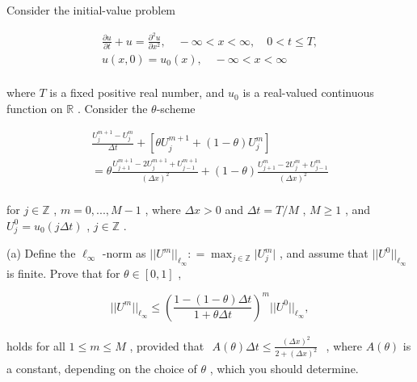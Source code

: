 \begin{exercise}
\label{applied:2025:5}
Consider the initial-value problem

\[
\begin{array}{l} \frac {\partial u}{\partial t} + u = \frac {\partial^ {2} u}{\partial x ^ {2}}, \quad - \infty <   x <   \infty , \quad 0 <   t \leq T, \\ u (x, 0) = u _ {0} (x), \quad - \infty <   x <   \infty \\ \end{array}
\]

where $T$ is a fixed positive real number, and $u _ { 0 }$ is a real-valued continuous function on $\mathbb { R }$ . Consider the $\theta$-scheme

\[
\begin{array}{l} \frac {U _ {j} ^ {m + 1} - U _ {j} ^ {m}}{\Delta t} + [ \theta U _ {j} ^ {m + 1} + (1 - \theta) U _ {j} ^ {m} ] \\ = \theta \frac {U _ {j + 1} ^ {m + 1} - 2 U _ {j} ^ {m + 1} + U _ {j - 1} ^ {m + 1}}{(\Delta x) ^ {2}} + (1 - \theta) \frac {U _ {j + 1} ^ {m} - 2 U _ {j} ^ {m} + U _ {j - 1} ^ {m}}{(\Delta x) ^ {2}} \\ \end{array}
\]

for $j \in \mathbb Z$ , $m = 0 , . . . , M - 1$ , where $\Delta x > 0$ and $\Delta t = T / M$ , $M \geq 1$ , and $U _ { j } ^ { 0 } = u _ { 0 } ( j \Delta t )$ , $j \in \mathbb Z$ .

(a) Define the $\ell _ { \infty }$ -norm as $\vert \vert U ^ { m } \vert \vert _ { \ell _ { \infty } } : = \operatorname* { m a x } _ { j \in \mathbb { Z } } \vert U _ { j } ^ { m } \vert$ , and assume that $| | U ^ { 0 } | | _ { \ell _ { \infty } }$ is finite. Prove that for $\theta \in [ 0 , 1 ]$ ,

\[
| | U ^ {m} | | _ {\ell_ {\infty}} \leq \left(\frac {1 - (1 - \theta) \Delta t}{1 + \theta \Delta t}\right) ^ {m} | | U ^ {0} | | _ {\ell_ {\infty}},
\]

holds for all $1 \leq m \leq M$ , provided that $\begin{array} { r } { A ( \theta ) \Delta t \leq \frac { ( \Delta x ) ^ { 2 } } { 2 + ( \Delta x ) ^ { 2 } } } \end{array}$ , where $A ( \theta )$ is a constant, depending on the choice of $\theta$ , which you should determine.


\end{exercise}
